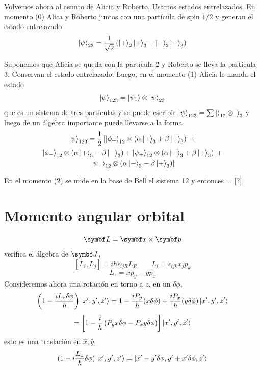 \documentclass[10pt,oneside]{CBFT_book}
\begin{document}
Volvemos ahora al asunto de Alicia y Roberto.
Usamos estados entrelazados. En momento (0) Alica y Roberto juntos con una partícula de spin $1/2$
y generan el estado entrelazado
\[
	\Ket{\psi}_{23} = \frac{1}{\sqrt{2}}
	\left( \Ket{+}_2\Ket{+}_3 + \Ket{-}_2\Ket{-}_3 \right)
\]

Suponemos que Alicia se queda con la partícula 2 y Roberto se lleva la partícula 3.
Conservan el estado entrelazado. Luego, en el momento (1) Alicia le manda el estado
\[
	\Ket{\psi}_{123} = \Ket{\psi_1} \otimes \Ket{\psi}_{23}
\]
que es un sistema de tres partículas y se puede escribir $ \Ket{\psi}_{123} = 
\sum \Ket{}_{12} \otimes \Ket{}_{3} $ y luego de un álgebra importante puede llevarse
a la forma
\begin{multline*}
	\Ket{\psi}_{123} = \frac{1}{2}
	\left[ 
	\Ket{\phi_+}_{12} \otimes \left( \alpha \Ket{+}_3 + \beta \Ket{-}_3 \right) \: + \right.\\ 
	\Ket{\phi_-}_{12} \otimes \left( \alpha \Ket{+}_3 - \beta \Ket{-}_3 \right) +
	\Ket{\psi_+}_{12} \otimes \left( \alpha \Ket{-}_3 + \beta \Ket{+}_3 \right) \: + \\
	\left. \Ket{\psi_-}_{12} \otimes \left( \alpha \Ket{-}_3 - \beta \Ket{+}_3 \right)
	\right]
\end{multline*}

En el momento (2) se mide en la base de Bell el sistema 12 y entonces ... [?]

\section{Momento angular orbital}

\[
	\vb{L} = \vb{x} \times \vb{p}
\]
verifica el álgebra de $\vb{J}$,
\[
	[ L_i, L_j ] = i\hbar \epsilon_{ijR} L_R \qquad L_i = \epsilon_{ijk}x_jp_k
\]
\[
	L_z = xp_y - yp_x
\]
Consideremos ahora una rotación en torno a $z$, en un $\delta\phi$,
\[
	\left( 1 - \frac{iL_z\delta\phi}{\hbar} \right) \Ket{x',y',z'} =
	1 - \frac{iP_y}{\hbar}(x\delta\phi) + \frac{iP_x}{\hbar}(y\delta\phi) \Ket{x',y',z'}
\]
\[
	= \left[ 1 - \frac{i}{\hbar}\left( P_y x\delta\phi - P_x y\delta\phi \right)\right] \Ket{x',y',z'}
\]
esto es una traslación en $\hat{x},\hat{y}$,
\[
	(1-i\frac{L_z}{\hbar}\delta\phi) \Ket{x',y',z'} = \Ket{x'-y'\delta\phi,y'+x'\delta\phi,z'}
\]
\end{document}
